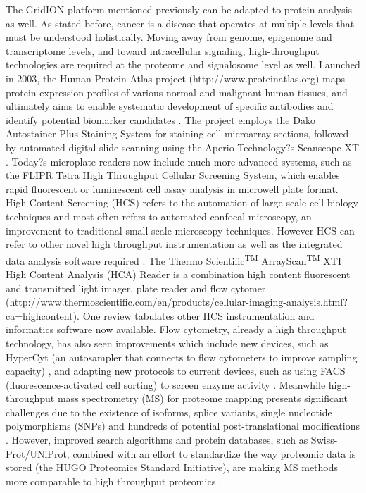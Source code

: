 \documentclass[12pt]{article}
\begin{document}
The GridION platform mentioned previously can be adapted to protein analysis as well. As stated before, cancer is a disease that operates at multiple levels that must be understood holistically. Moving away from genome, epigenome and transcriptome levels, and toward intracellular signaling, high-throughput technologies are required at the proteome and signalosome level as well. Launched in 2003, the Human Protein Atlas project (http://www.proteinatlas.org) maps protein expression profiles of various normal and malignant human tissues, and ultimately aims to enable systematic development of specific antibodies and identify potential biomarker candidates \cite{Ponten2011}. The project employs the Dako Autostainer Plus Staining System for staining cell microarray sections, followed by automated digital slide-scanning using the Aperio Technology?s Scanscope XT \cite{Fagerberg2011}. Today?s microplate readers now include much more advanced systems, such as the FLIPR Tetra High Throughput Cellular Screening System, which enables rapid fluorescent or luminescent cell assay analysis in microwell plate format. High Content Screening (HCS) refers to the automation of large scale cell biology techniques and most often refers to automated confocal microscopy, an improvement to traditional small-scale microscopy techniques. However HCS can refer to other novel high throughput instrumentation as well as the integrated data analysis software required \cite{Abraham2004}. The Thermo Scientific\textsuperscript{TM} ArrayScan\textsuperscript{TM} XTI High Content Analysis (HCA) Reader is a combination high content fluorescent and transmitted light imager, plate reader and flow cytomer (http://www.thermoscientific.com/en/products/cellular-imaging-analysis.html?ca=highcontent). One review \cite{Zanella2010} tabulates other HCS instrumentation and informatics software now available. Flow cytometry, already a high throughput technology, has also seen improvements which include new devices, such as HyperCyt\textregistered\: (an autosampler that connects to flow cytometers to improve sampling capacity) \cite{Edwards2004,Black2011}, and adapting new protocols to current devices, such as using FACS (fluorescence-activated cell sorting) to screen enzyme activity \cite{Yang2009}. Meanwhile high-throughput mass spectrometry (MS) for proteome mapping presents significant challenges due to the existence of isoforms, splice variants, single nucleotide polymorphisms (SNPs) and hundreds of potential post-translational modifications \cite{Nilsson2010}. However, improved search algorithms and protein databases, such as Swiss-Prot/UNiProt, combined with an effort to standardize the way proteomic data is stored (the HUGO Proteomics Standard Initiative), are making MS methods more comparable to high throughput proteomics \cite{Nilsson2010}.
	
\end{document}
